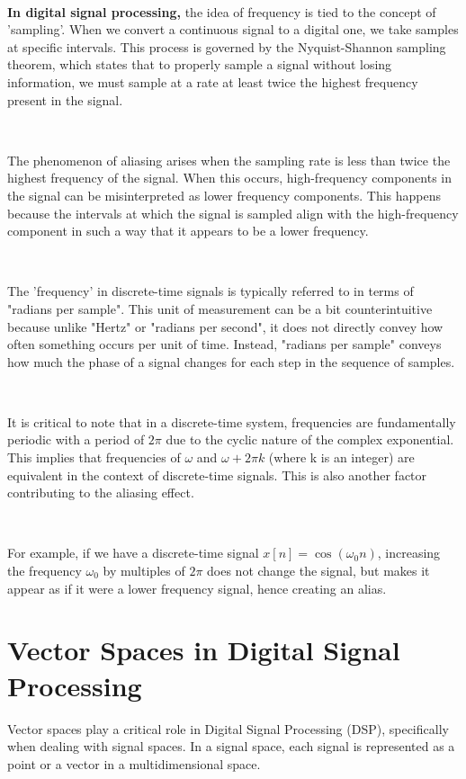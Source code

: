 \documentclass[11pt]{article}
\begin{document}
\ 

 \textbf{In digital signal processing,} the idea of frequency is tied to the concept of 'sampling'. When we convert a continuous signal to a digital one, we take samples at specific intervals. This process is governed by the Nyquist-Shannon sampling theorem, which states that to properly sample a signal without losing information, we must sample at a rate at least twice the highest frequency present in the signal.

\ 


The phenomenon of aliasing arises when the sampling rate is less than twice the highest frequency of the signal. When this occurs, high-frequency components in the signal can be misinterpreted as lower frequency components. This happens because the intervals at which the signal is sampled align with the high-frequency component in such a way that it appears to be a lower frequency.

\ 


The 'frequency' in discrete-time signals is typically referred to in terms of "radians per sample". This unit of measurement can be a bit counterintuitive because unlike "Hertz" or "radians per second", it does not directly convey how often something occurs per unit of time. Instead, "radians per sample" conveys how much the phase of a signal changes for each step in the sequence of samples.

\ 


It is critical to note that in a discrete-time system, frequencies are fundamentally periodic with a period of $2\pi$ due to the cyclic nature of the complex exponential. This implies that frequencies of $\omega$ and $\omega + 2\pi k$ (where k is an integer) are equivalent in the context of discrete-time signals. This is also another factor contributing to the aliasing effect.

\ 

For example, if we have a discrete-time signal $x[n] = \cos(\omega_0 n)$, increasing the frequency $\omega_0$ by multiples of $2\pi$ does not change the signal, but makes it appear as if it were a lower frequency signal, hence creating an alias.

\section*{Vector Spaces in Digital Signal Processing}

Vector spaces play a critical role in Digital Signal Processing (DSP), specifically when dealing with signal spaces. In a signal space, each signal is represented as a point or a vector in a multidimensional space. 
\end{document}
